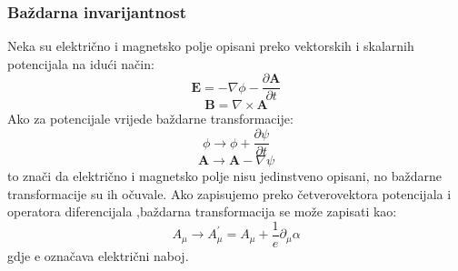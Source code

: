 \documentclass[12pt,a4paper,oneside]{article}
\begin{document}
\begin{linenumbers}
		\subsubsection{Baždarna invarijantnost}
		Neka su električno i magnetsko polje opisani preko vektorskih i skalarnih potencijala na idući način:
		\begin{equation}
		\boldsymbol{E} = -\nabla \phi - \frac{\partial \boldsymbol{A}}{\partial t}
		\end{equation}
		\begin{equation}
		\boldsymbol{B} = \nabla \times \boldsymbol{A}
		\end{equation}
		Ako za potencijale vrijede baždarne transformacije:
		\begin{equation}
		\phi \rightarrow \phi + \frac{\partial \psi}{\partial t}
		\end{equation}
		\begin{equation}
		\boldsymbol{A} \rightarrow \boldsymbol{A} - \nabla \psi 
		\end{equation}
		to znači da električno i magnetsko polje nisu jedinstveno opisani, no baždarne transformacije su ih očuvale. Ako zapisujemo preko četverovektora potencijala i operatora diferencijala ,baždarna transformacija se može zapisati kao:
		\begin{equation}
		A_\mu \rightarrow A_\mu ^{'} = A_\mu + \frac{1}{e} \partial_\mu \alpha
		\end{equation}
		gdje e označava električni naboj.
		

\end{linenumbers}
\end{document}

